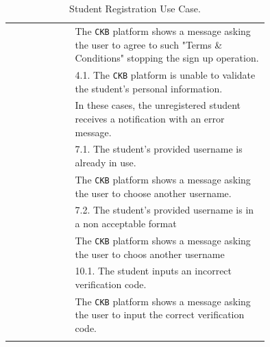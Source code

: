 \begin{center}
\begin{longtable}{lp{0.75\linewidth}}
            & The \verb|CKB| platform shows a message asking the user to agree to such "Terms \& Conditions" stopping the sign up operation.  \\                                                                                                   
        & 4.1. The \verb|CKB| platform is unable to validate the student's personal information.  \\                                                                                                         
            & In these cases, the unregistered student receives a notification with an error message.   \\
        & 7.1. The student's provided username is already in use.           \\                                                                                                
            & The \verb|CKB| platform shows a message asking the user to choose another username.   \\
        & 7.2. The student's provided username is in a non acceptable format    \\
            & The \verb|CKB| platform shows a message asking the user to choos another username    \\
        & 10.1. The student inputs an incorrect verification code.      \\                                                           
            & The \verb|CKB| platform shows a message asking the user to input the correct verification code.  \\
                                                                                        
        \hline
        \caption{Student Registration Use Case.}
        \label{tab: student_registration_use_case}
    \end{longtable}

   

\end{center}
